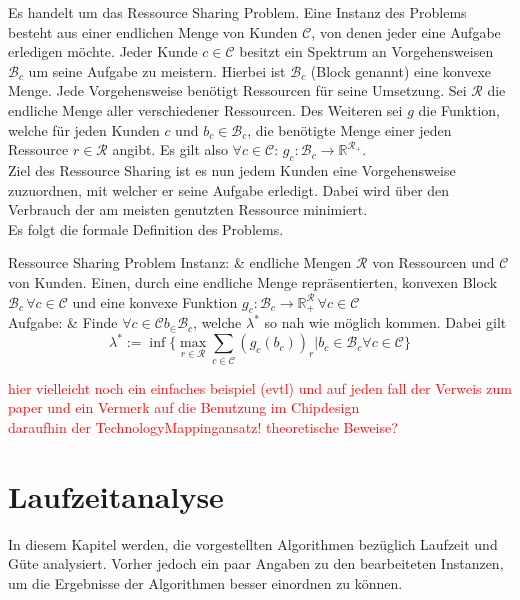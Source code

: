 \documentclass[11pt, a4paper, german]{article}
\newcommand{\TM}{TechnologyMapping}
\begin{document}
Es handelt um das Ressource Sharing Problem. Eine Instanz des Problems besteht aus einer endlichen Menge von Kunden $\mathcal{C}$, von denen jeder eine Aufgabe erledigen möchte.  Jeder Kunde $c \in \mathcal{C}$ besitzt ein Spektrum an Vorgehensweisen $\mathcal{B}_c$ um seine Aufgabe zu meistern. Hierbei ist $\mathcal{B}_c$ (Block genannt) eine konvexe Menge. Jede Vorgehensweise benötigt Ressourcen für seine Umsetzung. Sei $\mathcal{R}$ die endliche  Menge aller verschiedener Ressourcen.  Des Weiteren sei $g$ die Funktion, welche für jeden Kunden $c$ und $b_c \in \mathcal{B}_c$, die benötigte Menge einer jeden Ressource $r \in \mathcal{R}$ angibt. Es gilt also $\forall c \in \mathcal{C}: \, g_c:\mathcal{B}_c \rightarrow \mathbb{R}^{\mathcal{R}_+}$. \\
Ziel des Ressource Sharing ist es nun jedem Kunden eine Vorgehensweise zuzuordnen, mit welcher er seine Aufgabe erledigt. Dabei wird über den Verbrauch der am meisten genutzten Ressource minimiert. \\
Es folgt die formale Definition des Problems. \\
\begin{problem}[framed]{Ressource Sharing Problem}
  Instanz:  & endliche Mengen $\mathcal{R}$ von Ressourcen und $\mathcal{C}$ von Kunden. Einen, durch eine endliche Menge repräsentierten,  konvexen Block $\mathcal{B}_c \, \forall c \in \mathcal{C}$ und eine konvexe Funktion $g_c: \mathcal{B}_c \rightarrow \mathbb{R}^{\mathcal{R}}_+ \, \forall c \in \mathcal{C}$\\
  Aufgabe: & Finde $\forall c \in \mathcal{C} b_ \in \mathcal{B}_c$, welche $\lambda ^*$ so nah wie möglich kommen. Dabei gilt \[\lambda^* := \inf \{ \max\limits_{r \in \mathcal{R}} \sum\limits_{c \in \mathcal{C}}  (g_c(b_c))_r | b_c \in \mathcal{B}_c \forall c \in \mathcal{C} \}\]
\end{problem}
\textcolor{red}{hier vielleicht noch ein einfaches beispiel (evtl) und auf jeden fall der Verweis zum paper und ein Vermerk auf die Benutzung im Chipdesign \\ daraufhin der \TM ansatz! theoretische Beweise?}


\section{Laufzeitanalyse}
\label{sec:analyse}
In diesem Kapitel werden, die vorgestellten Algorithmen bezüglich Laufzeit und Güte analysiert. Vorher jedoch ein paar Angaben zu den bearbeiteten Instanzen, um die Ergebnisse der Algorithmen besser einordnen zu können.
\end{document}
